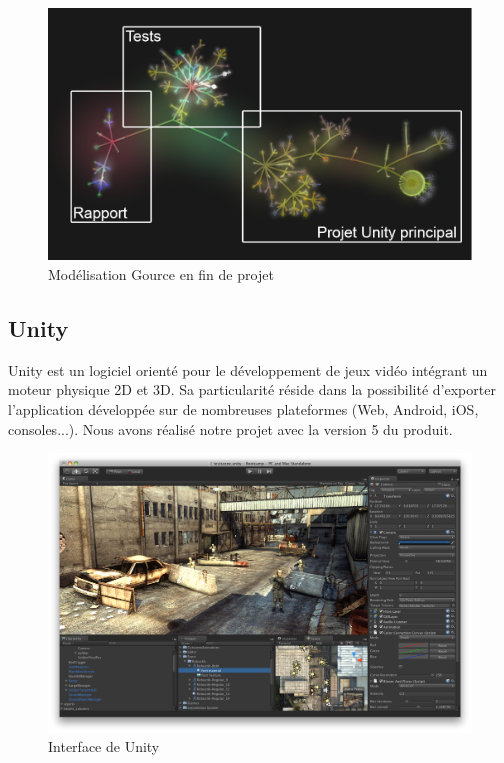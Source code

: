 \begin{figure}[H]\centering
  \includegraphics[scale=.3]{./img/gource_over.png}
  \caption{Modélisation Gource en fin de projet}
  \label{gource_over}
\end{figure}
 

\subsection{Unity}

Unity est un logiciel orienté pour le développement de jeux vidéo intégrant un moteur physique 2D et 3D. Sa particularité réside dans la possibilité d'exporter l'application développée sur de nombreuses plateformes (Web, Android, iOS, consoles...). Nous avons réalisé notre projet avec la version 5 du produit.


\begin{figure}[H]\centering
  \includegraphics[scale=.28]{./img/unity-3D.png}
  \caption{Interface de Unity}
  \label{unity}
\end{figure}

